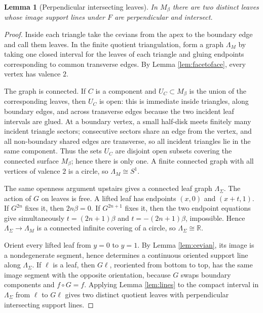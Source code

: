 \documentclass[12pt]{article}
\newcommand{\R}{\mathbb R}
\theoremstyle{plain}
\newtheorem{lemma}[theorem]{Lemma}
\begin{document}
\begin{lemma}[Perpendicular intersecting leaves]\label{lem:perpleaves}
In \(M_\beta\) there are two distinct leaves whose image support lines under
\(F\) are perpendicular and intersect.
\end{lemma}

\begin{proof}
Inside each triangle take the cevians from the apex to the boundary edge and
call them leaves.  In the finite quotient triangulation, form a graph
\(\Lambda_M\) by taking one closed interval for the leaves of each triangle and
gluing endpoints corresponding to common transverse edges.  By
Lemma \ref{lem:facetoface}, every vertex has valence \(2\).

The graph is connected.  If \(C\) is a component and \(U_C\subset M_\beta\) is
the union of the corresponding leaves, then \(U_C\) is open: this is immediate
inside triangles, along boundary edges, and across transverse edges because the
two incident leaf intervals are glued.  At a boundary vertex, a small half-disk
meets finitely many incident triangle sectors; consecutive sectors share an
edge from the vertex, and all non-boundary shared edges are transverse, so all
incident triangles lie in the same component.  Thus the sets \(U_C\) are
disjoint open subsets covering the connected surface \(M_\beta\); hence there
is only one.  A finite connected graph with all vertices of valence \(2\) is a
circle, so \(\Lambda_M\cong S^1\).

The same openness argument upstairs gives a connected leaf graph
\(\Lambda_\Sigma\).  The action of \(G\) on leaves is free.  A lifted leaf has
endpoints \((x,0)\) and \((x+t,1)\).  If \(G^{2n}\) fixes it, then
\(2n\beta=0\).  If \(G^{2n+1}\) fixes it, then the two endpoint equations give
simultaneously \(t=(2n+1)\beta\) and \(t=-(2n+1)\beta\), impossible.  Hence
\(\Lambda_\Sigma\to\Lambda_M\) is a connected infinite covering of a circle,
so \(\Lambda_\Sigma\cong\R\).

Orient every lifted leaf from \(y=0\) to \(y=1\).  By
Lemma \ref{lem:cevian}, its image is a nondegenerate segment, hence determines
a continuous oriented support line along \(\Lambda_\Sigma\).  If \(\ell\) is a
leaf, then \(G\ell\), reoriented from bottom to top, has the same image segment
with the opposite orientation, because \(G\) swaps boundary components and
\(f\circ G=f\).  Applying Lemma \ref{lem:lines} to the compact interval in
\(\Lambda_\Sigma\) from \(\ell\) to \(G\ell\) gives two distinct quotient
leaves with perpendicular intersecting support lines.
\end{proof}
\end{document}
